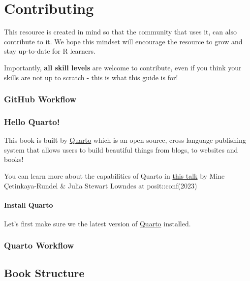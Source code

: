 \documentclass[
  letterpaper,
  DIV=11,
  numbers=noendperiod]{scrreprt}
\begin{document}

\chapter{Contributing}\label{contributing}

This resource is created in mind so that the community that uses it, can
also contribute to it. We hope this mindset will encourage the resource
to grow and stay up-to-date for R learners.

Importantly, \textbf{all skill levels} are welcome to contribute, even
if you think your skills are not up to scratch - this is what this guide
is for!

\subsection{GitHub Workflow}\label{github-workflow}

\subsection{Hello Quarto!}\label{hello-quarto}

This book is built by \href{https://quarto.org/}{Quarto} which is an
open source, cross-language publishing system that allows users to build
beautiful things from blogs, to websites and books!

You can learn more about the capabilities of Quarto in
\href{https://www.youtube.com/watch?v=p7Hxu4coDl8}{this talk} by Mine
Çetinkaya-Rundel \& Julia Stewart Lowndes at posit::conf(2023)

\subsubsection{Install Quarto}\label{install-quarto}

Let's first make sure we the latest version of
\href{https://quarto.org/docs/get-started/}{Quarto} installed.

\subsection{Quarto Workflow}\label{quarto-workflow}

\section{Book Structure}\label{book-structure}
\end{document}
